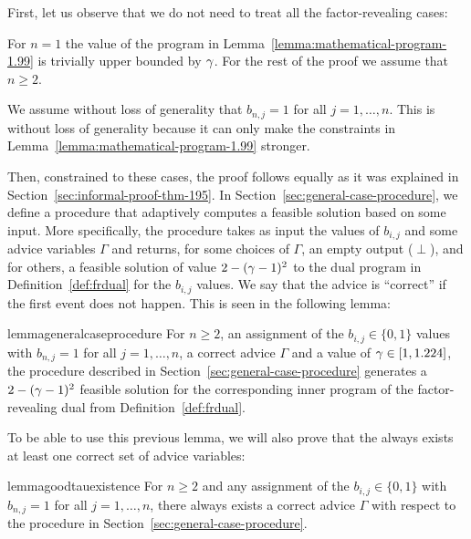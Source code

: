 \smallskip First, let us observe that we do not need to treat all the factor-revealing cases:
\begin{observation}
\label{obs:n-not-zero}
For $n=1$ the value of the program in Lemma~\ref{lemma:mathematical-program-1.99} is trivially upper bounded by $\gamma$.
For the rest of the proof we assume that $n \geq 2$.
\end{observation}
\begin{observation}
\label{obs:b1}
We assume without loss of generality that $b_{n,j} = 1$ for all $j = 1, \ldots, n$. This is without loss of generality because it can only make the constraints in Lemma~\ref{lemma:mathematical-program-1.99} stronger.
\end{observation}
Then, constrained to these cases, the proof follows equally as it was explained in Section~\ref{sec:informal-proof-thm-195}.
In Section~\ref{sec:general-case-procedure}, we define a procedure that adaptively computes a feasible solution based on some input. More specifically, the procedure takes as input the values of $b_{i,j}$ and some advice variables $\Gamma$ and returns, for some choices of $\Gamma$, an empty output ($\perp$), and for others, a feasible solution of value $2-(\gamma-1)^2$ to the dual program in Definition~\ref{def:frdual} for the $b_{i,j}$ values.
We say that the advice is ``correct'' if the first event does not happen. This is seen in the following lemma:

\begin{restatable}{lemma}{generalcaseprocedure}\label{lem:general-case-procedure}
    For $n \geq 2$, an assignment of the $b_{i,j}\in\{0,1\}$ values with $b_{n,j} = 1$ for all $j = 1, \ldots, n$, a correct advice $\Gamma$ and a value of $\gamma\in[1,1.224]$, the procedure described in Section~\ref{sec:general-case-procedure} generates a $2-(\gamma-1)^2$ feasible solution for the corresponding inner program of the factor-revealing dual from Definition~\ref{def:frdual}.
\end{restatable}

To be able to use this previous lemma, we will also prove that the always exists at least one correct set of advice variables:

\begin{restatable}{lemma}{goodtauexistence}\label{lem:good-tau-existence}
    For $n \geq 2$ and any assignment of the $b_{i,j}\in\{0,1\}$ with $b_{n,j} = 1$ for all $j = 1, \ldots, n$, there always exists a correct advice $\Gamma$ with respect to the procedure in Section~\ref{sec:general-case-procedure}.
\end{restatable}

